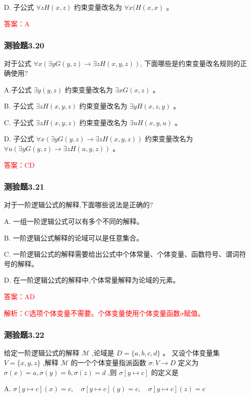 \documentclass[UTF8, heading=true]{ctexart}
\begin{document}
D. 子公式 $\forall z H(x, z)$ 约束变量改名为 $\forall x(H(x, x)$ 。

\textcolor{red}{答案：A}

\subsubsection{测验题3.20}

对于公式 $\forall x(\exists y G(y, z) \rightarrow \exists z H(x, y, z))$, 下面哪些是约束变量改名规则的正确使用?

A.子公式 $\exists y(y, z)$ 约束变量改名为 $\exists x G(x, z)$ 。

B.
子公式 $\exists z H(x, y, z)$ 约束变量改名为 $\exists y H(x, z, y)$ 。

C.
子公式 $\exists z H(x, y, z)$ 约束变量改名为 $\exists u H(x, y, u)$ 。

D.
子公式 $\forall x(\exists y G(y, z) \rightarrow \exists z H(x, y, z))$ 约束变量改名为 $\forall u(\exists y G(y, z) \rightarrow \exists z H(u, y, z))$ 。

\textcolor{red}{答案：CD}

\subsubsection{测验题3.21}

对于一阶逻辑公式的解释,下面哪些说法是正确的?

A. 一组一阶逻辑公式可以有多个不同的解释。

B.  一阶逻辑公式解释的论域可以是任意集合。

C.   一阶逻辑公式的解释需要给出公式中个体常量、个体变量、函数符号、谓词符号的解释。

D. 在一阶逻辑公式的解释中,个体常量解释为论域的元素。

\textcolor{red}{答案：AD}

\textcolor{red}{解析：C选项个体变量不需要。个体变量使用个体变量函数$\sigma$赋值。}

\subsubsection{测验题3.22}

给定一阶逻辑公式的解释 $\mathcal{M}$ ,论域是 $D=\{a, b, c, d\}$ 。 又设个体变量集 $V=\{x, y, z\}$ ,解释 $\mathcal{M}$ 的一个个体变量指派函数 $\sigma: V \rightarrow D$ 定义为 $\sigma(x)=a, \sigma(y)=b, \sigma(z)=d$ ,则 $\sigma[y \mapsto c]$ 的定义是 $\qquad$

A. $\sigma[y \mapsto c](x)=c, \quad \sigma[y \mapsto c](y)=c, \quad \sigma[y \mapsto c](z)=c$
\end{document}
